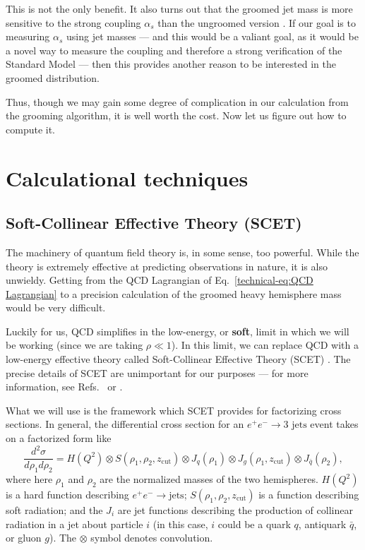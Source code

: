 \documentclass[../thesis.tex]{subfiles}
\providecommand{\zcut}{z_{\mathrm{cut}}}
\begin{document}
	This is not the only benefit. It also turns out that the groomed jet mass is more sensitive to the strong coupling $\alpha_s$ than the ungroomed version \cite{larkoski_improving_2020}. If our goal is to measuring $\alpha_s$ using jet masses --- and this would be a valiant goal, as it would be a novel way to measure the coupling and therefore a strong verification of the Standard Model --- then this provides another reason to be interested in the groomed distribution.

	Thus, though we may gain some degree of complication in our calculation from the grooming algorithm, it is well worth the cost. Now let us figure out how to compute it.


\section{Calculational techniques}
\subsection{Soft-Collinear Effective Theory (SCET)}
	The machinery of quantum field theory is, in some sense, too powerful. While the theory is extremely effective at predicting observations in nature, it is also unwieldy. Getting from the QCD Lagrangian of Eq.~\ref{technical-eq:QCD Lagrangian} to a precision calculation of the groomed heavy hemisphere mass would be very difficult.

	Luckily for us, QCD simplifies in the low-energy, or \textbf{soft}, limit in which we will be working (since we are taking $\rho \ll 1$). In this limit, we can replace QCD with a low-energy effective theory called Soft-Collinear Effective Theory (SCET) \cite{bauer_summing_2000,bauer_effective_2001,bauer_invariant_2001,bauer_soft-collinear_2002,beneke_soft-collinear_2002,beneke_multipole-expanded_2003,hill_spectator_2003}. The precise details of SCET are unimportant for our purposes --- for more information, see Refs.~\cite{schwartz_quantum_2014} or \cite{becher_introduction_2015-1}.

	What we will use is the framework which SCET provides for factorizing cross sections. In general, the differential cross section for an $e^+ e^- \to \text{3 jets}$ event takes on a factorized form like \cite{ellis_jet_2010,frye_factorization_2016}
	\begin{equation}
		\frac{d^2\sigma}{d\rho_1 d\rho_2} = H(Q^2) \otimes S(\rho_1, \rho_2, \zcut) \otimes J_q(\rho_1) \otimes J_g(\rho_1, \zcut) \otimes J_{\bar q}(\rho_2),
	\end{equation} 
	where here $\rho_1$ and $\rho_2$ are the normalized masses of the two hemispheres. $H(Q^2)$ is a hard function describing $e^+ e^- \to \text{jets}$; $S(\rho_1, \rho_2, \zcut)$ is a function describing soft radiation; and the $J_i$ are jet functions describing the production of collinear radiation in a jet about particle $i$ (in this case, $i$ could be a quark $q$, antiquark $\bar q$, or gluon $g$). The $\otimes$ symbol denotes convolution.
\end{document}

